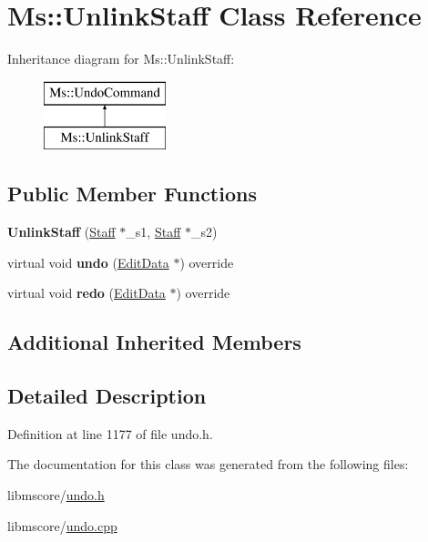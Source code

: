 \hypertarget{class_ms_1_1_unlink_staff}{}\section{Ms\+:\+:Unlink\+Staff Class Reference}
\label{class_ms_1_1_unlink_staff}
Inheritance diagram for Ms\+:\+:Unlink\+Staff\+:\begin{figure}[H]
\begin{center}
\leavevmode
\includegraphics[height=2.000000cm]{class_ms_1_1_unlink_staff}
\end{center}
\end{figure}
\subsection*{Public Member Functions}
\begin{DoxyCompactItemize}
\item 
\mbox{\label{class_ms_1_1_unlink_staff_a8ef426d75f8d31d1e8aee4df6c0bfb45}} 
{\bfseries Unlink\+Staff} (\hyperlink{class_ms_1_1_staff}{Staff} $\ast$\+\_\+s1, \hyperlink{class_ms_1_1_staff}{Staff} $\ast$\+\_\+s2)
\item 
\mbox{\label{class_ms_1_1_unlink_staff_a1afc3c31e494f4dc448bb6b214472449}} 
virtual void {\bfseries undo} (\hyperlink{class_ms_1_1_edit_data}{Edit\+Data} $\ast$) override
\item 
\mbox{\label{class_ms_1_1_unlink_staff_a1396d6f0e9de35948812aa542603196f}} 
virtual void {\bfseries redo} (\hyperlink{class_ms_1_1_edit_data}{Edit\+Data} $\ast$) override
\end{DoxyCompactItemize}
\subsection*{Additional Inherited Members}


\subsection{Detailed Description}


Definition at line 1177 of file undo.\+h.



The documentation for this class was generated from the following files\+:\begin{DoxyCompactItemize}
\item 
libmscore/\hyperlink{undo_8h}{undo.\+h}\item 
libmscore/\hyperlink{undo_8cpp}{undo.\+cpp}\end{DoxyCompactItemize}
